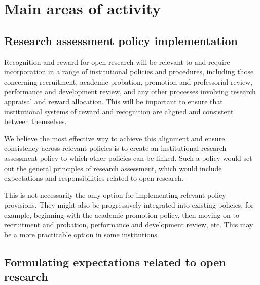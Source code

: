 \documentclass[
  letterpaper,
  DIV=11,
  numbers=noendperiod,
  oneside]{scrreprt}
\begin{document}
\section{Main areas of activity}\label{main-areas-of-activity-4}

\subsection{Research assessment policy
implementation}\label{research-assessment-policy-implementation}

Recognition and reward for open research will be relevant to and require
incorporation in a range of institutional policies and procedures,
including those concerning recruitment, academic probation, promotion
and professorial review, performance and development review, and any
other processes involving research appraisal and reward allocation. This
will be important to ensure that institutional systems of reward and
recognition are aligned and consistent between themselves.

We believe the most effective way to achieve this alignment and ensure
consistency across relevant policies is to create an institutional
research assessment policy to which other policies can be linked. Such a
policy would set out the general principles of research assessment,
which would include expectations and responsibilities related to open
research.

This is not necessarily the only option for implementing relevant policy
provisions. They might also be progressively integrated into existing
policies, for example, beginning with the academic promotion policy,
then moving on to recruitment and probation, performance and development
review, etc. This may be a more practicable option in some institutions.

\subsection{Formulating expectations related to open
research}\label{formulating-expectations-related-to-open-research}
\end{document}
